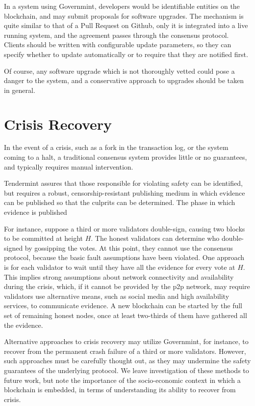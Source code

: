 In a system using Governmint, developers would be identifiable entities on the blockchain,
and may submit proposals for software upgrades. 
The mechanism is quite similar to that of a Pull Request on Github, 
only it is integrated into a live running system,
and the agreement passes through the consensus protocol.
Clients should be written with configurable update parameters, 
so they can specify whether to update automatically or to require that they are notified first.

Of course, any software upgrade which is not thoroughly vetted could pose a danger to the system,
and a conservative approach to upgrades should be taken in general.

\section{Crisis Recovery}

In the event of a crisis, such as a fork in the transaction log,
or the system coming to a halt, 
a traditional consensus system provides little or no guarantees,
and typically requires manual intervention.

Tendermint assures that those responsible for violating safety can be identified,
but requires a robust, censorship-resistant publishing medium in which evidence can be published 
so that the culprits can be determined. 
The phase in which evidence is published 

For instance, suppose a third or more validators double-sign, 
causing two blocks to be committed at height $H$.
The honest validators can determine who double-signed by gossipping the votes.
At this point, they cannot use the consensus protocol, because the basic fault assumptions have been violated.
One approach is for each validator to wait until they have all the evidence for every vote at $H$.
This implies strong assumptions about network connectivity and availability during the crisis,
which, if it cannot be provided by the p2p network, may require validators use alternative means, 
such as social media and high availability services, to communicate evidence.
A new blockchain can be started by the full set of remaining honest nodes, 
once at least two-thirds of them have gathered all the evidence.

Alternative approaches to crisis recovery may utilize Governmint, 
for instance, to recover from the permanent crash failure of a third or more validators.
However, such approaches must be carefully thought out, 
as they may undermine the safety guarantees of the underlying protocol.
We leave investigation of these methods to future work, 
but note the importance of the socio-economic context in which a blockchain is embedded, in terms of understanding its ability to recover from crisis.

